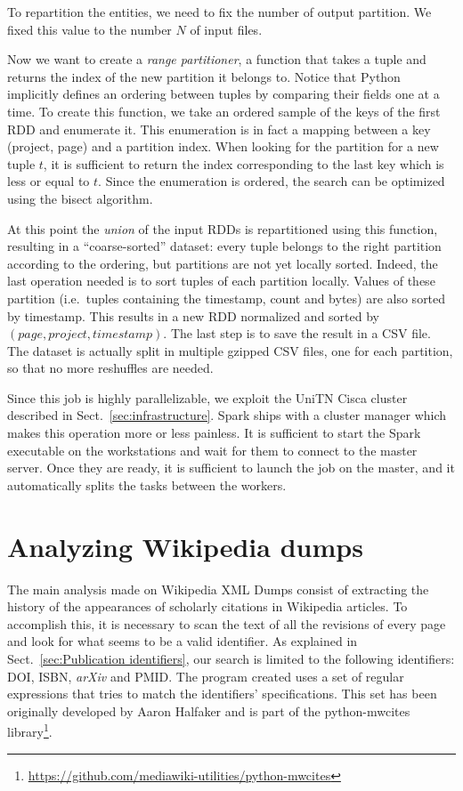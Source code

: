 To repartition the entities, we need to fix the number of output partition.
We fixed this value to the number $N$ of input files.

Now we want to create a \emph{range partitioner}, a function that takes a tuple and returns the index of the new partition it belongs to.
Notice that Python implicitly defines an ordering between tuples by comparing their fields one at a time.
To create this function, we take an ordered sample of the keys of the first \ac{RDD} and enumerate it.
This enumeration is in fact a mapping between a key (project, page) and a partition index.
When looking for the partition for a new tuple $t$, it is sufficient to return the index corresponding to the last key which is less or equal to $t$.
Since the enumeration is ordered, the search can be optimized using the bisect algorithm.

At this point the \emph{union} of the input \acp{RDD} is repartitioned using this function, resulting in a ``coarse-sorted'' dataset: every tuple belongs to the right partition according to the ordering, but partitions are not yet locally sorted.
Indeed, the last operation needed is to sort tuples of each partition locally.
Values of these partition (i.e.\ tuples containing the timestamp, count and bytes) are also sorted by timestamp.
This results in a new \ac{RDD} normalized and sorted by $(page, project, timestamp)$.
The last step is to save the result in a CSV file.
The dataset is actually split in multiple gzipped CSV files, one for each partition, so that no more reshuffles are needed.

Since this job is highly parallelizable, we exploit the UniTN Cisca cluster described in Sect.~\ref{sec:infrastructure}.
Spark ships with a cluster manager which makes this operation more or less painless.
It is sufficient to start the Spark executable on the workstations and wait for them to connect to the master server.
Once they are ready, it is sufficient to launch the job on the master, and it automatically splits the tasks between the workers.

\section{Analyzing Wikipedia dumps}
\label{sec:Analyzing Wikipedia dumps}
The main analysis made on Wikipedia XML Dumps consist of extracting the history of the appearances of scholarly citations in Wikipedia articles.
To accomplish this, it is necessary to scan the text of all the revisions of every page and look for what seems to be a valid identifier.
As explained in Sect.~\ref{sec:Publication identifiers}, our search is limited to the following identifiers: \ac{DOI}, \ac{ISBN}, \emph{arXiv} and \ac{PMID}.
The program created uses a set of regular expressions that tries to match the identifiers' specifications.
This set has been originally developed by Aaron Halfaker and is part of the python-mwcites library\footnote{\url{https://github.com/mediawiki-utilities/python-mwcites}}.

